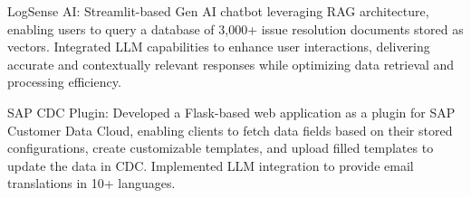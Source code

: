 





   {\projectentry
    {LogSense AI:} {Streamlit-based Gen AI chatbot leveraging RAG architecture, enabling users to query a database of 3,000+ issue resolution documents stored as vectors. Integrated LLM capabilities to enhance user interactions, delivering accurate and contextually relevant responses while optimizing data retrieval and processing efficiency.} 
    }

    {\projectentry
    {SAP CDC Plugin:} {Developed a Flask-based web application as a plugin for SAP Customer Data Cloud, enabling clients to fetch data fields based on their stored configurations, create customizable templates, and upload filled templates to update the data in CDC. Implemented LLM integration to provide email translations in 10+ languages.} 
    }
    



